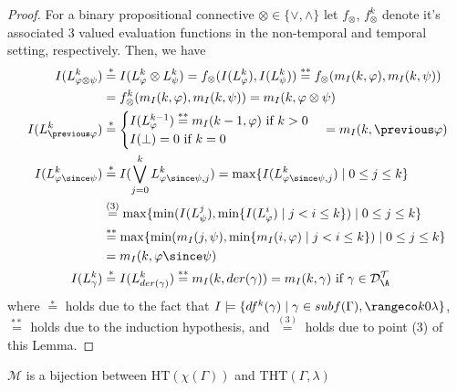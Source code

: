 \begin{proof}
  For a binary propositional connective
  $\otimes \in \{ \vee, \wedge\}$ let $f_{\otimes}$, $f_{\otimes}^k$
  denote it's associated 3 valued evaluation functions in the
  non-temporal and temporal setting, respectively. Then, we have
  \begin{align*}
    I(L^k_{\varphi \otimes \psi}) &\stackrel{*}{=} I(L^k_{\varphi} \otimes L^k_{\psi}) 
    = f_{\otimes}(I(L^k_\varphi),I(L^k_\psi)) \stackrel{**}{=} f_{\otimes}(m_I(k,\varphi),m_I(k,\psi))  \\
    &= f_{\otimes}^k(m_I(k,\varphi),m_I(k,\psi)) = m_I(k,\varphi \otimes \psi)\\
    I(L^k_{\previous \varphi}) &\stackrel{*}{=}
      \begin{cases}
        I(L^{k-1}_\varphi) \stackrel{**}{=} m_I(k-1,\varphi) \text{ if } k > 0\\
        I(\bot) = 0 \text{ if } k = 0 
      \end{cases} = m_I(k,\previous \varphi)\\
    I(L^k_{\varphi \since \psi}) &\stackrel{*}= I(\bigvee_{j=0}^{k} L^k_{\varphi \since \psi,j}) 
    = \max \{ I(L^k_{\varphi \since \psi,j}) \mid 0 \leq j \leq k \}\\
                                  &\stackrel{(3)}{=} \max \{\min (I(L^j_{\psi}), \min \{I(L^i_{\varphi}) \mid j<i \leq k\}) \mid 0 \leq j \leq k\} \\
                                  &\stackrel{**}{=} \max \{\min (m_I(j, \psi), \min \{m_I(i, \varphi) \mid j<i \leq k\}) \mid 0 \leq j \leq k\} \\
                                  &= m_I(k,\varphi \since \psi)\\
  I(L^k_{\gamma}) &\stackrel{*}{=} I(L^k_{der(\gamma)}) \stackrel{**}{=} m_I(k,der(\gamma)) = m_I(k,\gamma) \text{ if } \gamma \in \langdat
  \end{align*}
  where $\stackrel{*}=$ holds due to the fact that
  $I \models \{ df^k(\gamma) \mid \gamma \in subf(\Gamma), \kinlambda
  \}$, $\stackrel{**}=$ holds due to the induction hypothesis, and
  $\stackrel{(3)}{=}$ holds due to point (3) of this Lemma.
\end{proof}

\begin{theorem}\label{theorem:translation}
  $\mathcal{M}$ is a bijection between $\text{HT}(\chi(\Gamma))$ and
  $\text{THT}(\Gamma,\lambda)$
\end{theorem}

